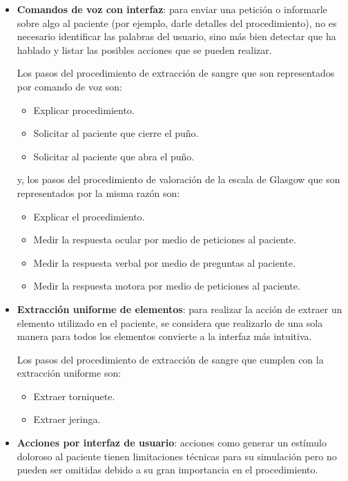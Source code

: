 \begin{itemize}

\item \textbf{Comandos de voz con interfaz}:  para enviar una petición o
    informarle sobre algo al paciente (por ejemplo, darle detalles del
    procedimiento), no es necesario identificar las palabras del usuario, sino
    más bien detectar que ha hablado y listar las posibles acciones que se
    pueden realizar.
    
    Los pasos del procedimiento de extracción de sangre que son representados por 
    comando de voz son:
    
    \begin{itemize}
        \item Explicar procedimiento.
        \item Solicitar al paciente que cierre el puño.
        \item Solicitar al paciente que abra el puño.
    \end{itemize}
    
    y, los pasos del procedimiento de valoración de la escala de Glasgow 
    que son representados por la misma razón son:
    \begin{itemize}
        \item Explicar el procedimiento.
        \item Medir la respuesta ocular por medio de peticiones al paciente.
        \item Medir la respuesta verbal por medio de preguntas al paciente.
        \item Medir la respuesta motora por medio de peticiones al paciente.
    \end{itemize}

\item \textbf{Extracción uniforme de elementos}: para realizar la acción de
    extraer un elemento utilizado en el paciente, se considera que realizarlo de
    una sola manera para todos los elementos convierte a la interfaz más
    intuitiva.

    Los pasos del procedimiento de extracción de sangre que cumplen con la extracción 
    uniforme son:
    
    \begin{itemize}
        \item Extraer torniquete.
        \item Extraer jeringa.
    \end{itemize}
    
\item \textbf{Acciones por interfaz de usuario}: acciones como generar un
    estímulo doloroso al paciente tienen limitaciones técnicas para su
    simulación pero no pueden ser omitidas debido a su gran importancia en el
    procedimiento.
    

\end{itemize}
